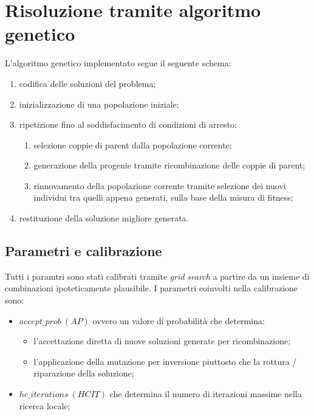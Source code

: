\documentclass[a4paper]{article}
\begin{document}
    \section{Risoluzione tramite algoritmo genetico}
        L'algoritmo genetico implementato segue il seguente schema:
        \begin{enumerate}
            \item codifica delle soluzioni del problema;
            \item inizializzazione di una popolazione iniziale;
            \item ripetizione fino al soddisfacimento di condizioni di arresto:
                \begin{enumerate}
                    \item selezione coppie di parent dalla popolazione corrente;
                    \item generazione della progenie tramite ricombinazione delle coppie di parent;
                    \item rinnovamento della popolazione corrente tramite selezione dei nuovi individui
                        tra quelli appena generati, sulla base della misura di fitness;
                \end{enumerate}
            \item restituzione della soluzione migliore generata.
        \end{enumerate}

        \subsection{Parametri e calibrazione}
            Tutti i paramtri sono stati calibrati tramite \emph{grid search} a partire da un insieme di combinazioni ipoteticamente plausibile.
            I parametri coinvolti nella calibrazione sono:
            \begin{itemize}
                \item $accept\_prob\ (AP)$ ovvero un valore di probabilit\`a che determina:
                    \begin{itemize}
                        \item l'accettazione diretta di nuove soluzioni generate per ricombinazione;
                        \item l'applicazione della mutazione per inversione piuttosto che la rottura / riparazione della soluzione;
                    \end{itemize}
                \item $hc\_iterations\ (HCIT)$ che determina il numero di iterazioni massime nella ricerca locale;
            \end{itemize}
\end{document}
